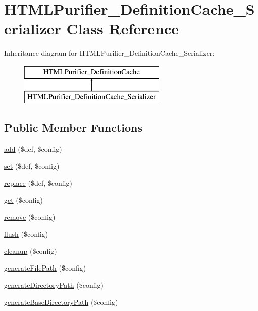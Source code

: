 \hypertarget{classHTMLPurifier__DefinitionCache__Serializer}{\section{H\+T\+M\+L\+Purifier\+\_\+\+Definition\+Cache\+\_\+\+Serializer Class Reference}
\label{classHTMLPurifier__DefinitionCache__Serializer}
}
Inheritance diagram for H\+T\+M\+L\+Purifier\+\_\+\+Definition\+Cache\+\_\+\+Serializer\+:\begin{figure}[H]
\begin{center}
\leavevmode
\includegraphics[height=2.000000cm]{classHTMLPurifier__DefinitionCache__Serializer}
\end{center}
\end{figure}
\subsection*{Public Member Functions}
\begin{DoxyCompactItemize}
\item 
\hyperlink{classHTMLPurifier__DefinitionCache__Serializer_a919929d401e535c67170c98ae91fd43d}{add} (\$def, \$config)
\item 
\hyperlink{classHTMLPurifier__DefinitionCache__Serializer_a2bb97e7af45bb8d715e67ab052c75fdd}{set} (\$def, \$config)
\item 
\hyperlink{classHTMLPurifier__DefinitionCache__Serializer_acb863fb49acda9b20ebc74e81190d15a}{replace} (\$def, \$config)
\item 
\hyperlink{classHTMLPurifier__DefinitionCache__Serializer_a9a85d63743d0a04c255c5e0a41ec9a79}{get} (\$config)
\item 
\hyperlink{classHTMLPurifier__DefinitionCache__Serializer_a274061e1ed89a7840a4f4b2cf1f440fa}{remove} (\$config)
\item 
\hyperlink{classHTMLPurifier__DefinitionCache__Serializer_a042fb8264f8c61a6c60e11ea5d28547a}{flush} (\$config)
\item 
\hyperlink{classHTMLPurifier__DefinitionCache__Serializer_a53686ed7cdec12abef4b761c4c20fa2c}{cleanup} (\$config)
\item 
\hyperlink{classHTMLPurifier__DefinitionCache__Serializer_ad18f778e5a8ca5f9ba921b23078bb983}{generate\+File\+Path} (\$config)
\item 
\hyperlink{classHTMLPurifier__DefinitionCache__Serializer_a5d91bdfc11200a585a6d4fdbea54c0be}{generate\+Directory\+Path} (\$config)
\item 
\hyperlink{classHTMLPurifier__DefinitionCache__Serializer_ad5ea17d7c17ea67852f3aeaff3707057}{generate\+Base\+Directory\+Path} (\$config)
\end{DoxyCompactItemize}
